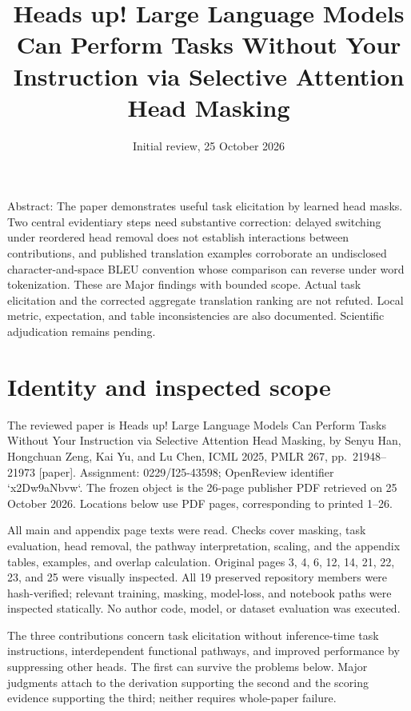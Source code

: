 \documentclass[10pt]{article}
\title{Heads up! Large Language Models Can Perform Tasks Without Your Instruction via Selective Attention Head Masking}
\author{}
\date{Initial review, 25 October 2026}
\begin{document}
\maketitle
Abstract: The paper demonstrates useful task elicitation by learned head masks. Two central evidentiary steps need substantive correction: delayed switching under reordered head removal does not establish interactions between contributions, and published translation examples corroborate an undisclosed character-and-space BLEU convention whose comparison can reverse under word tokenization. These are Major findings with bounded scope. Actual task elicitation and the corrected aggregate translation ranking are not refuted. Local metric, expectation, and table inconsistencies are also documented. Scientific adjudication remains pending.\par
\section*{Identity and inspected scope}
The reviewed paper is Heads up! Large Language Models Can Perform Tasks Without Your Instruction via Selective Attention Head Masking, by Senyu Han, Hongchuan Zeng, Kai Yu, and Lu Chen, ICML 2025, PMLR 267, pp. 21948–21973 [paper]. Assignment: 0229/I25-43598; OpenReview identifier `x2Dw9aNbvw`. The frozen object is the 26-page publisher PDF retrieved on 25 October 2026. Locations below use PDF pages, corresponding to printed 1–26.\par
All main and appendix page texts were read. Checks cover masking, task evaluation, head removal, the pathway interpretation, scaling, and the appendix tables, examples, and overlap calculation. Original pages 3, 4, 6, 12, 14, 21, 22, 23, and 25 were visually inspected. All 19 preserved repository members were hash-verified; relevant training, masking, model-loss, and notebook paths were inspected statically. No author code, model, or dataset evaluation was executed.\par
The three contributions concern task elicitation without inference-time task instructions, interdependent functional pathways, and improved performance by suppressing other heads. The first can survive the problems below. Major judgments attach to the derivation supporting the second and the scoring evidence supporting the third; neither requires whole-paper failure.\par
\end{document}

